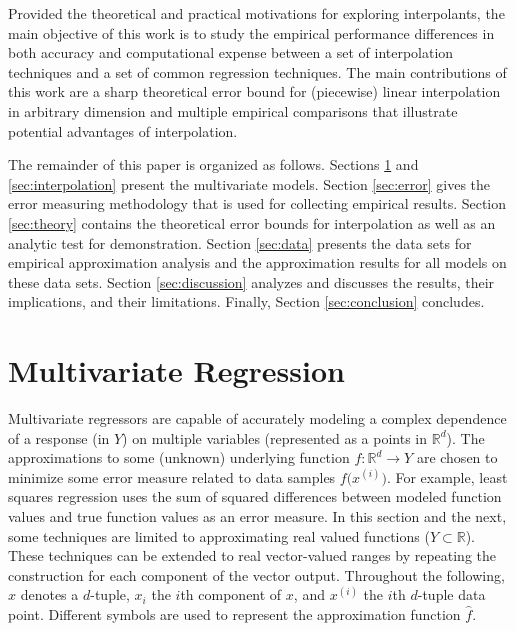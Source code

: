 \documentclass[smallextended,final]{svjour3}  %
\begin{document}
Provided the theoretical and practical motivations for exploring
interpolants, the main objective of this work is to study the
empirical performance differences in both accuracy and computational
expense between a set of interpolation techniques and a set of common
regression techniques. The main contributions of this work are a sharp
theoretical error bound for (piecewise) linear interpolation in
arbitrary dimension and multiple empirical comparisons that illustrate
potential advantages of interpolation.

The remainder of this paper is organized as follows. Sections
\ref{sec:regression} and \ref{sec:interpolation} present the
multivariate models. Section \ref{sec:error} gives the error measuring
methodology that is used for collecting empirical results. Section
\ref{sec:theory} contains the theoretical error bounds for
interpolation as well as an analytic test for demonstration. Section
\ref{sec:data} presents the data sets for empirical approximation
analysis and the approximation results for all models on these data
sets. Section \ref{sec:discussion} analyzes and discusses the results,
their implications, and their limitations. Finally, Section
\ref{sec:conclusion} concludes.

\section{Multivariate Regression}
\label{sec:regression}
Multivariate regressors are capable of accurately modeling a complex
dependence of a response (in $Y$) on multiple variables (represented
as a points in $\mathbb{R}^{d}$). The approximations to some (unknown)
underlying function $f: \mathbb{R}^d \rightarrow Y$ are chosen to
minimize some error measure related to data samples
$f\bigl(x^{(i)}\bigr)$. For example, least squares regression uses the
sum of squared differences between modeled function values and true
function values as an error measure. In this section and the next,
some techniques are limited to approximating real valued functions ($Y
\subset \mathbb{R}$). These techniques can be extended to real
vector-valued ranges by repeating the construction for each component
of the vector output. Throughout the following, $x$ denotes a
$d$-tuple, $x_i$ the $i$th component of $x$, and $x^{(i)}$ the $i$th
$d$-tuple data point. Different symbols are used to represent the
approximation function $\hat f$.
\end{document}

